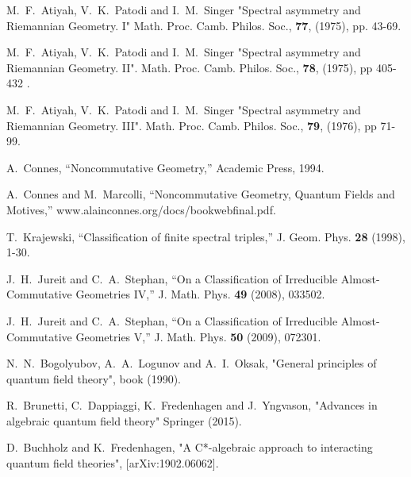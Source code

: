\documentclass[letterpaper,11pt]{article}
\begin{document}
\begin{thebibliography}{99}
M.~F.~Atiyah, V.~K.~Patodi and I.~M.~Singer
"Spectral asymmetry and Riemannian Geometry. I"
Math. Proc. Camb. Philos. Soc., {\bf 77}, (1975), pp. 43-69.


M.~F.~Atiyah, V.~K.~Patodi and I.~M.~Singer
"Spectral asymmetry and Riemannian Geometry. II". Math. Proc. Camb. Philos. Soc., {\bf 78}, (1975), pp 405-432 .


M.~F.~Atiyah, V.~K.~Patodi and I.~M.~Singer
"Spectral asymmetry and Riemannian Geometry. III". Math. Proc. Camb. Philos. Soc., {\bf 79}, (1976), pp 71-99.

 


A.~Connes,
``Noncommutative Geometry,'' Academic Press, 1994.


A.~Connes and M.~Marcolli,
``Noncommutative Geometry, Quantum Fields and Motives,''
 www.alainconnes.org/docs/bookwebfinal.pdf. 


T.~Krajewski,
``Classification of finite spectral triples,''
J. Geom. Phys. \textbf{28} (1998), 1-30.


J.~H.~Jureit and C.~A.~Stephan,
``On a Classification of Irreducible Almost-Commutative Geometries IV,''
J. Math. Phys. \textbf{49} (2008), 033502.



J.~H.~Jureit and C.~A.~Stephan,
``On a Classification of Irreducible Almost-Commutative Geometries V,''
J. Math. Phys. \textbf{50} (2009), 072301.





N.~N.~Bogolyubov, A.~A.~Logunov and A.~I.~Oksak,
"General principles of quantum field theory",
book (1990).



R.~Brunetti, C.~Dappiaggi, K.~Fredenhagen and J.~Yngvason, 
"Advances in algebraic quantum field theory"
Springer (2015). 


  

D.~Buchholz and K.~Fredenhagen, "A C*-algebraic approach to interacting quantum field theories",
[arXiv:1902.06062].







\end{thebibliography}
\end{document}

